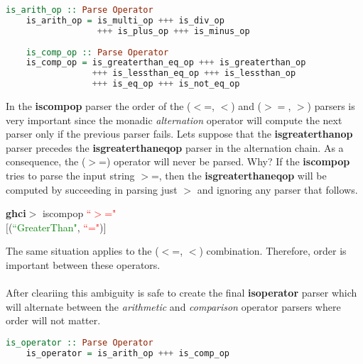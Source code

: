 \documentclass[a4paper, onecolumn]{article}
\begin{document}
    \begin{tcolorbox}
    \begin{lstlisting}[language=Haskell] 
    is_arith_op :: Parse Operator 
    is_arith_op = is_multi_op +++ is_div_op 
                  +++ is_plus_op +++ is_minus_op
                  
    is_comp_op :: Parse Operator
    is_comp_op = is_greaterthan_eq_op +++ is_greaterthan_op 
                 +++ is_lessthan_eq_op +++ is_lessthan_op 
                 +++ is_eq_op +++ is_not_eq_op
    \end{lstlisting}
    \end{tcolorbox}
    
    \noindent In the \textbf{is\textunderscore comp\textunderscore op} parser the order of the ($<$=, $<$) and ($>=$, $>$) parsers is very important since the monadic \textit{alternation} operator will compute the next parser only if the previous parser fails. Lets suppose that the \textbf{is\textunderscore greaterthan\textunderscore op} parser precedes the \textbf{is\textunderscore greaterthan\textunderscore eq\textunderscore op} parser in the alternation chain. As a consequence, the ($>$=) operator will never be parsed. Why? If the \textbf{is\textunderscore comp\textunderscore op} tries to parse the input string $>$=, then the \textbf{is\textunderscore greaterthan\textunderscore eq\textunderscore op} will be computed by succeeding in parsing just $>$ and ignoring any parser that follows.
    
    \begin{center}
            \textbf{ghci$>$} is\textunderscore comp\textunderscore op \textcolor{red}{``$>$="} \\
             $\big[$(\textcolor{green}{``GreaterThan"}, \textcolor{red}{``="})$\big]$
        \end{center}
    
    \noindent The same situation applies to the ($<$=, $<$) combination. Therefore, order is important between these operators. \\ \\ 
    After cleariing this ambiguity is safe to create the final \textbf{is\textunderscore operator} parser which will alternate between the \textit{arithmetic} and \textit{comparison} operator parsers where order will not matter. 
    
    \begin{tcolorbox}
    \begin{lstlisting}[language=Haskell] 
    is_operator :: Parse Operator 
    is_operator = is_arith_op +++ is_comp_op
    \end{lstlisting}
    \end{tcolorbox}
\end{document}
